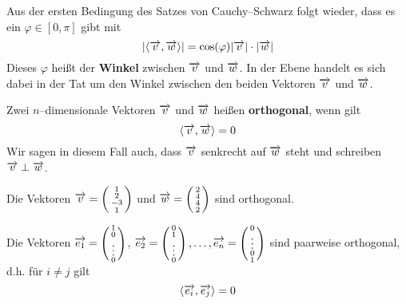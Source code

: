 \begin{notiz} Aus der ersten Bedingung des Satzes von Cauchy--Schwarz folgt wieder, dass es ein $\varphi \in 
[0, \pi]$ gibt mit 
  	$$ \vert \langle \overrightarrow{v},  \overrightarrow{w} \rangle \vert = \cos(\varphi) \vert \overrightarrow{v} \vert 
  	\cdot  \vert \overrightarrow{w} \vert $$
Dieses $\varphi$ heißt der \textbf{Winkel} zwischen $\overrightarrow{v}$ und 
$\overrightarrow{w}$. In der Ebene handelt es sich dabei in der Tat um den Winkel zwischen den beiden 
Vektoren $\overrightarrow{v}$ und $\overrightarrow{w}$. 
\end{notiz}

\begin{definition} Zwei $n$--dimensionale Vektoren $\overrightarrow{v}$ und $\overrightarrow{w}$ heißen 
 \textbf{orthogonal}, wenn gilt
  	$$ \langle \overrightarrow{v},  \overrightarrow{w} \rangle = 0 $$
Wir sagen in diesem Fall auch, dass $\overrightarrow{v}$ senkrecht auf $\overrightarrow{w}$ steht und schreiben 
$\overrightarrow{v} \perp \overrightarrow{w}$.
\end{definition}

\begin{beispiel} Die Vektoren  $\overrightarrow{v} = \left( \begin{smallmatrix} 1 \\ 2 \\ -3 \\ 1
\end{smallmatrix} \right)$ und  $\overrightarrow{w} = \left( \begin{smallmatrix} 2 \\ 4 \\ 4 \\ 2 
\end{smallmatrix} \right)$ sind orthogonal. 
\end{beispiel}

\begin{beispiel} Die Vektoren  $\overrightarrow{e_1} = 
\left( \begin{smallmatrix} 1 \\ 0 \\ \vdots \\ 0
\end{smallmatrix} \right)$, $\overrightarrow{e_2} = \left( \begin{smallmatrix} 0 \\ 1 \\ \vdots \\ 0 
\end{smallmatrix} \right), \ldots , \overrightarrow{e_n} = \left( \begin{smallmatrix} 0 \\ \vdots \\ 0 \\ 1 
\end{smallmatrix} \right)$ sind paarweise orthogonal, d.h. für $i \neq j$ gilt
  $$ \langle \overrightarrow{e_i}, \overrightarrow{e_j}  \rangle =  0 $$
\end{beispiel}

